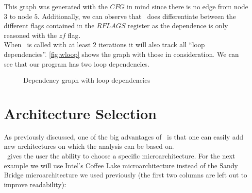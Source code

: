 This graph was generated with the $CFG$ in mind since there is no edge from node $3$ to node $5$. Additionally, we can observe that \suaca\ does differentiate between the different flags contained in the $RFLAGS$ register as the dependence is only reasoned with the $zf$ flag.\\
When \suaca\ is called with at least $2$ iterations it will also track all ``loop dependencies''. \autoref{fig:wloop} shows the graph with those in consideration. We can see that our program has two loop dependencies.

\begin{figure}
    \centering
    \caption{Dependency graph with loop dependencies}
    \label{fig:wloop}
\end{figure}

\FloatBarrier

\section{Architecture Selection}

As previously discussed, one of the big advantages of \suaca\ is that one can easily add new architectures on which the analysis can be based on.\\
\suaca\ gives the user the ability to choose a specific microarchitecture. For the next example we will use Intel's Coffee Lake microarchitecture instead of the Sandy Bridge microarchitecture we used previously (the first two columns are left out to improve readability):\\

